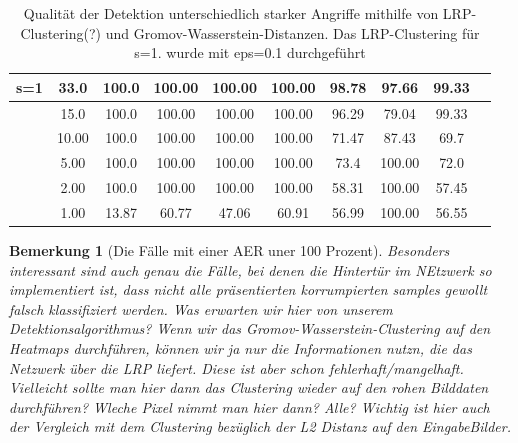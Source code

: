 \documentclass[11pt,a4paper]{article}
\newtheorem{remark}[theorem]{Bemerkung}
\numberwithin{equation}{section}
\begin{document}
\begin{table}[ht]
\begin{center}
{\begin{tabular}{|l|c|c|ccc|ccc|c|}
				s=1 			& 33.0 			& 100.0 	& 100.00& 100.00	& 100.00& 98.78	& 97.66	& 99.33	& \\ \hline
								& 15.0			& 100.0		& 100.00& 100.00	& 100.00& 96.29	& 79.04	& 99.33	& \\
								& 10.00			& 100.0		& 100.00& 100.00	& 100.00& 71.47	& 87.43 & 69.7 	& \\
								& 5.00			& 100.0		& 100.00& 100.00	& 100.00& 73.4	& 100.00& 72.0	&\\
								& 2.00			& 100.0		& 100.00& 100.00	& 100.00& 58.31 & 100.00& 57.45		\\
								& 1.00			& 13.87		& 60.77 & 47.06		& 60.91	& 56.99	& 100.00& 56.55 
			\end{tabular}}
			\caption[Vergleich von Angriffen und Verteidigungen für SPA]{Qualität der Detektion unterschiedlich starker Angriffe mithilfe von LRP-Clustering(?) und Gromov-Wasserstein-Distanzen. Das LRP-Clustering für s=1. wurde mit eps=0.1 durchgeführt}
			\label{tab:SPA_def_inv3_gwclustering}	
		\end{center}
	\end{table}
	\begin{remark}[Die Fälle mit einer AER uner 100 Prozent]
		Besonders interessant sind auch genau die Fälle, bei denen die Hintertür im NEtzwerk so implementiert ist, dass nicht alle präsentierten korrumpierten samples gewollt falsch klassifiziert werden. Was erwarten wir hier von unserem Detektionsalgorithmus? Wenn wir das Gromov-Wasserstein-Clustering auf den Heatmaps durchführen, können wir ja nur die Informationen nutzn, die das Netzwerk über die LRP liefert. Diese ist aber schon fehlerhaft/mangelhaft. Vielleicht sollte man hier dann das Clustering wieder auf den rohen Bilddaten durchführen?  Wleche Pixel nimmt man hier dann? Alle? Wichtig ist hier auch der Vergleich mit dem Clustering bezüglich der L2 Distanz auf den EingabeBilder.
	\end{remark}
	
\end{document}
